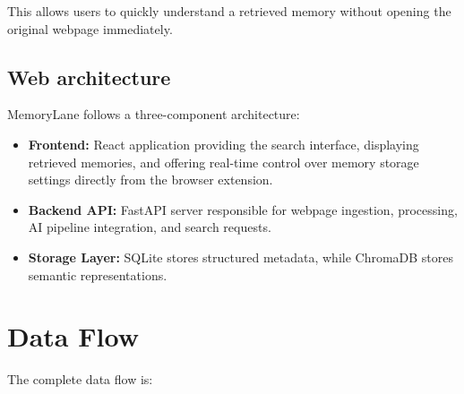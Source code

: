 \documentclass[11pt,a4paper]{article}
\begin{document}
This allows users to quickly understand a retrieved memory without opening the original webpage immediately.


\subsection{Web architecture}

MemoryLane follows a three-component architecture:

\begin{itemize}[leftmargin=0.7cm]

\item \textbf{Frontend:} React application providing the search interface, displaying retrieved memories, and offering real-time control over memory storage settings directly from the browser extension.

\item \textbf{Backend API:} FastAPI server responsible for webpage ingestion, processing, AI pipeline integration, and search requests.

\item \textbf{Storage Layer:} SQLite stores structured metadata, while ChromaDB stores semantic representations.

\end{itemize}


\section{Data Flow}

The complete data flow is:
\end{document}

